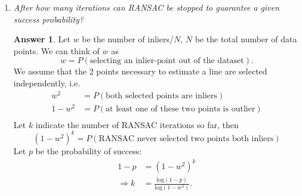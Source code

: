 \documentclass[a4paper,12 pt]{article}
\theoremstyle{definition}
\theoremstyle{remark}
\theoremstyle{definition}
\theoremstyle{definition}
\theoremstyle{definition}
\theoremstyle{definition}
\theoremstyle{remark}
\theoremstyle{remark}
\theoremstyle{definition}
\theoremstyle{definition}
\newtheorem*{answer}{Answer}
\begin{document}
\begin{enumerate}
 \item \textit{After how many iterations can RANSAC be stopped to guarantee a given success probability?}
\begin{answer}
Let $w$ be the number of inliers/$N$, $N$ be the total number of data points. We can think of $w$ as
\begin{equation}
w=P(\text{selecting an inlier-point out of the dataset}).
\end{equation}
We assume that the 2 points necessary to estimate a line are selected independently, i.e.
\begin{equation}
\begin{split}
w^2&=P(\text{both selected points are inliers})\\
1-w^2&=P(\text{at least one of these two points is outlier})\\
\end{split}
\end{equation}
Let $k$ indicate the number of RANSAC iterations so far, then
\begin{equation}
(1-w^2)^k=P(\text{RANSAC never selected two points both inliers})
\end{equation}
Let $p$ be the probability of success:
\begin{equation}
\begin{split}
1-p&=(1-w^2)^k\\
\Rightarrow k&=\frac{\text{log}(1-p)}{\text{log}(1-w^2)}.
\end{split}
\end{equation}


\end{answer}
\end{enumerate}
\end{document}

